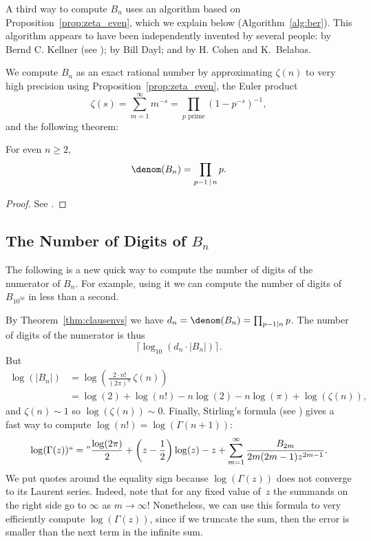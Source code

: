 A third way to compute $B_n$ uses
an algorithm based on Proposition~\ref{prop:zeta_even},
which we explain below (Algorithm~\ref{alg:ber}).
This algorithm appears to
have been independently invented by several people: by Bernd C.
Kellner (see \cite{bernoulli}); by Bill Dayl; and by H. Cohen and
K.~Belabas.

We compute $B_n$ as an exact rational number
by approximating $\zeta(n)$ to very high precision using 
Proposition~\ref{prop:zeta_even}, the
Euler product
$$
  \zeta(s)=\sum_{m=1}^\infty m^{-s} =\prod_{p\text{ prime}} (1-p^{-s})^{-1},
$$
and the following theorem:
\begin{theorem} \label{thm:clausenvs}
For even $n\geq 2$,
$$
  \denom(B_n)=\prod_{p-1 \,\mid\, n} p.
$$
\end{theorem}
\begin{proof}
See \cite[Ch.~X, Thm.~2.1]{lang:modular}.
\end{proof}

\subsection{The Number of Digits of $B_n$}\label{sec:bernnum}
The following is a new quick way to
compute the number of digits of the numerator of $B_n$.  For example,
using it we can compute the number of digits of $B_{10^{50}}$ in
less than a second.

By Theorem~\ref{thm:clausenvs} we have $d_n = \denom(B_n) =
  \prod_{p-1\mid n} p$.  The number of digits of the numerator is thus
$$
  \lceil \log_{10}(d_n \cdot |B_n|) \rceil.
$$
But 
\begin{align*}
\log(|B_n|) &= \log\left(\frac{2\cdot n!}{(2\pi)^n}\,\zeta(n)\right)\\
     &= \log(2) + \log(n!) - n\log(2) - n\log(\pi) + \log(\zeta(n)),
   \end{align*}
and $\zeta(n)\sim 1$ so $\log(\zeta(n))\sim 0$. 
 Finally, Stirling's formula (see \cite[pg.~198--206]{ahlfors}) 
gives a fast way to compute $\log(n!) = \log(\Gamma(n+1))$:
\begin{equation}\label{eqn:loggamma}
  \log(\Gamma(z)) ``=\text{''}
  \frac{\log(2\pi)}{2} + \left(z - \frac{1}{2}\right)\log(z)
            - z + \sum_{m=1}^{\infty} 
            \frac{B_{2m}}{2m(2m-1)z^{2m-1}}.
\end{equation}
We put quotes around the equality
sign because $\log(\Gamma(z))$ does
not converge to its Laurent series.   Indeed, note that
for any fixed value of~$z$ the summands
on the right side go to $\infty$ as $m\to \infty$!
Nonetheless, we can use this formula to very
efficiently compute $\log(\Gamma(z))$,
since if we truncate the
sum, then the error is smaller than the next
term in the infinite sum.




